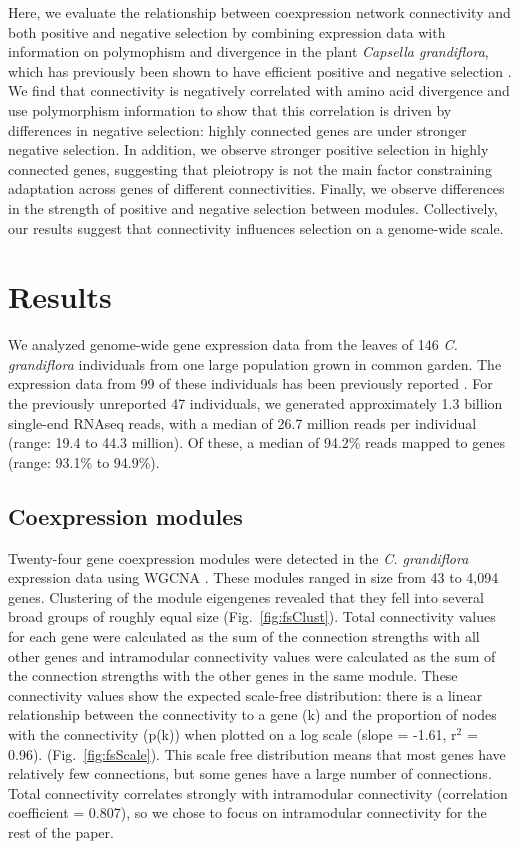 Here, we evaluate the relationship between coexpression network connectivity and both positive and negative selection by combining  expression data with information on polymophism and divergence in the plant \textit{Capsella grandiflora}, which has previously been shown to have efficient positive and negative selection \citep{Williamson2014-tf}. We find that connectivity is negatively correlated with amino acid divergence and use polymorphism information to show that this correlation is driven by differences in negative selection: highly connected genes are under stronger negative selection. In addition, we observe stronger positive selection in highly connected genes, suggesting that pleiotropy is not the main factor constraining adaptation across genes of different connectivities. Finally, we observe differences in the strength of positive and negative selection between modules. Collectively, our results suggest that connectivity influences selection on a genome-wide scale.

\section{Results}

We analyzed genome-wide gene expression data from the leaves of 146 \textit{C. grandiflora} individuals from one large population grown in common garden. The expression data from 99 of these individuals has been previously reported \citep{Josephs2015-nx}. For the previously unreported 47 individuals, we generated approximately 1.3 billion single-end RNAseq reads, with a median of 26.7 million reads per individual (range: 19.4 to 44.3 million). Of these, a median of 94.2\% reads mapped to genes (range: 93.1\% to 94.9\%).

\subsection{Coexpression modules}
Twenty-four gene coexpression modules were detected in the \textit{C. grandiflora} expression data using WGCNA \citep{langfelder2008}. These modules ranged in size from 43 to 4,094 genes. Clustering of the module eigengenes revealed that they fell into several broad groups of roughly equal size (Fig.~\ref{fig:fsClust}). Total connectivity values for each gene were calculated as the sum of the connection strengths with all other genes and intramodular connectivity values were calculated as the sum of the connection strengths with the other genes in the same module. These connectivity values show the expected scale-free distribution: there is a linear relationship between the connectivity to a gene (k) and the proportion of nodes with the connectivity (p(k)) when plotted on a log scale (slope = -1.61, r$^{2}$ = 0.96). (Fig.~\ref{fig:fsScale}). This scale free distribution means that most genes have relatively few connections, but some genes have a large number of connections. Total connectivity correlates strongly with intramodular connectivity (correlation coefficient = 0.807), so we chose to focus on intramodular connectivity for the rest of the paper.

